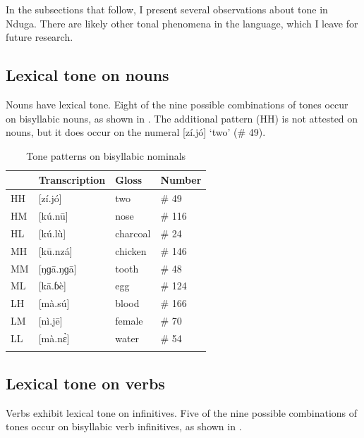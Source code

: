 \documentclass[output=paper,colorlinks,citecolor=brown
]{langscibook}
\begin{document}
In the subsections that follow, I present several observations about tone in Nduga. There are likely other tonal phenomena in the language, which I leave for future research.

\subsection{Lexical tone on nouns}

Nouns have lexical tone. Eight of the  nine possible combinations of tones occur on bisyllabic nouns, as shown in . The additional pattern (HH) is not attested on nouns, but it does occur on the numeral [zí.jó] ‘two’ (\# 49).

\begin{table}
\caption{Tone patterns on bisyllabic nominals}
\label{tab:olson:tonenouns}
 \begin{tabular}{llll}
  \lsptoprule
    & Transcription & Gloss & Number \\
  \midrule
 HH & [zí.jó] & two & \# 49 \\
 HM & [kú.nū] & nose & \# 116 \\
 HL & [kú.lù] & charcoal & \# 24 \\
 MH & [kū.nzá] & chicken & \# 146 \\
 MM & [ŋɡā.ŋɡā] & tooth & \# 48 \\
 ML & [kā.ɓè] & egg & \# 124 \\
 LH & [mà.sú] & blood & \# 166 \\
 LM & [nì.jē] & female & \# 70 \\
 LL & [mà.nɛ̀] & water & \# 54 \\
  \lspbottomrule
 \end{tabular}
\end{table}

\subsection{Lexical tone on verbs}

Verbs exhibit lexical tone on infinitives. Five of the nine possible combinations of tones occur on bisyllabic verb infinitives, as shown in .
\end{document}

